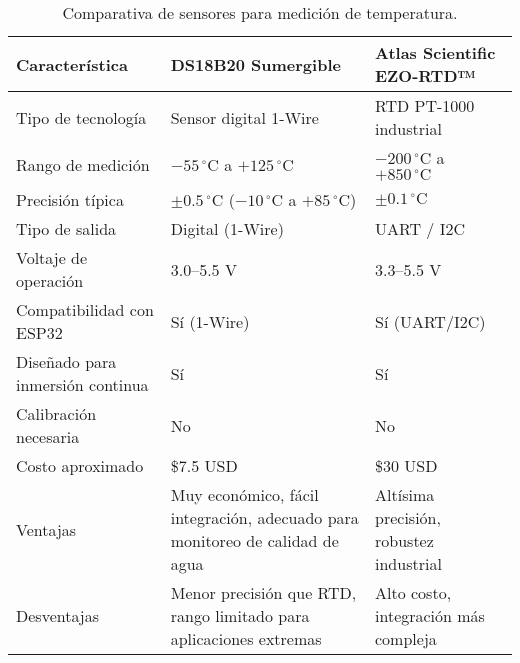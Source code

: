\begin{table}[H]
    \centering
    \renewcommand{\arraystretch}{1.5} %
    
    \begin{tabular}{
        |p{4cm}    %
        |p{5cm}    %
        |p{5cm}|   %
    }
    \hline
    \textbf{Característica} 
        & \textbf{DS18B20 Sumergible} 
        & \textbf{Atlas Scientific EZO-RTD™} \\ 
    \hline
    
    Tipo de tecnología 
        & Sensor digital 1-Wire 
        & RTD PT-1000 industrial \\ 
    \hline
    
    Rango de medición 
        & $-55\,^{\circ}\mathrm{C}$ a $+125\,^{\circ}\mathrm{C}$ 
        & $-200\,^{\circ}\mathrm{C}$ a $+850\,^{\circ}\mathrm{C}$ \\ 
    \hline
    
    Precisión típica 
        & $\pm0.5\,^{\circ}\mathrm{C}$ ($-10\,^{\circ}\mathrm{C}$ a $+85\,^{\circ}\mathrm{C}$) 
        & $\pm0.1\,^{\circ}\mathrm{C}$ \\ 
    \hline
    
    Tipo de salida 
        & Digital (1-Wire) 
        & UART / I2C \\ 
    \hline
    
    Voltaje de operación 
        & 3.0--5.5 V 
        & 3.3--5.5 V \\ 
    \hline
    
    Compatibilidad con ESP32 
        & Sí (1-Wire) 
        & Sí (UART/I2C) \\ 
    \hline
    
    Diseñado para inmersión continua 
        & Sí 
        & Sí \\ 
    \hline
    
    Calibración necesaria 
        & No 
        & No \\ 
    \hline
    
    Costo aproximado 
        & \$7.5 USD 
        & \$30 USD \\ 
    \hline
    
    Ventajas 
        & Muy económico, fácil integración, adecuado para monitoreo de calidad de agua
          
        & Altísima precisión, robustez industrial \\
    \hline
    
    Desventajas 
        & Menor precisión que RTD, rango limitado para aplicaciones extremas 
        & Alto costo, integración más compleja \\ 
    \hline
    \end{tabular}
    
    \caption{Comparativa de sensores para medición de temperatura.}
    \label{tab:sensor_temperatura}
\end{table}

